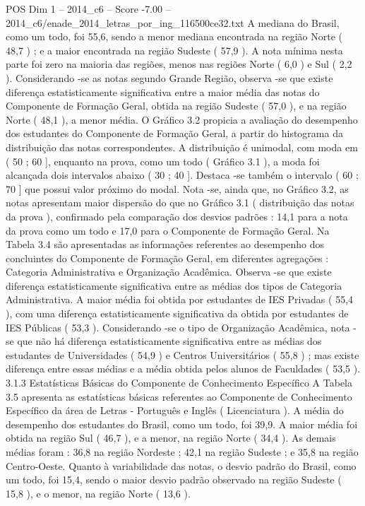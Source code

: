 \begin{textsample}{POS Dim 1 – 2014\_c6 – Score -7.00 – 2014\_c6/enade\_2014\_letras\_por\_ing\_116500ce32.txt}
A mediana do Brasil, como um todo, foi 55,6, sendo a menor mediana encontrada na região Norte ( 48,7 ) ; e a maior encontrada na região Sudeste ( 57,9 ).
A nota mínima nesta parte foi zero na maioria das regiões, menos nas regiões Norte ( 6,0 ) e Sul ( 2,2 ).
Considerando -se as notas segundo Grande Região, observa -se que existe diferença estatisticamente significativa entre a maior média das notas do Componente de Formação Geral, obtida na região Sudeste ( 57,0 ), e na região Norte ( 48,1 ), a menor média.
O Gráfico 3.2 propicia a avaliação do desempenho dos estudantes do Componente de Formação Geral, a partir do histograma da distribuição das notas correspondentes.
A distribuição é unimodal, com moda em ( 50 ; 60 ], enquanto na prova, como um todo ( Gráfico 3.1 ), a moda foi alcançada dois intervalos abaixo ( 30 ; 40 ].
Destaca -se também o intervalo ( 60 ; 70 ] que possui valor próximo do modal.
Nota -se, ainda que, no Gráfico 3.2, as notas apresentam maior dispersão do que no Gráfico 3.1 ( distribuição das notas da prova ), confirmado pela comparação dos desvios padrões : 14,1 para a nota da prova como um todo e 17,0 para o Componente de Formação Geral.
Na Tabela 3.4 são apresentadas as informações referentes ao desempenho dos concluintes do Componente de Formação Geral, em diferentes agregações : Categoria Administrativa e Organização Acadêmica.
Observa -se que existe diferença estatisticamente significativa entre as médias dos tipos de Categoria Administrativa.
A maior média foi obtida por estudantes de IES Privadas ( 55,4 ), com uma diferença estatisticamente significativa da obtida por estudantes de IES Públicas ( 53,3 ).
Considerando -se o tipo de Organização Acadêmica, nota -se que não há diferença estatisticamente significativa entre as médias dos estudantes de Universidades ( 54,9 ) e Centros Universitários ( 55,8 ) ; mas existe diferença entre essas médias e a média obtida pelos alunos de Faculdades ( 53,5 ). 3.1.3 Estatísticas Básicas do Componente de Conhecimento Específico A Tabela 3.5 apresenta as estatísticas básicas referentes ao Componente de Conhecimento Específico da área de Letras - Português e Inglês ( Licenciatura ).
A média do desempenho dos estudantes do Brasil, como um todo, foi 39,9.
A maior média foi obtida na região Sul ( 46,7 ), e a menor, na região Norte ( 34,4 ).
As demais médias foram : 36,8 na região Nordeste ; 42,1 na região Sudeste ; e 35,8 na região Centro-Oeste.
Quanto à variabilidade das notas, o desvio padrão do Brasil, como um todo, foi 15,4, sendo o maior desvio padrão observado na região Sudeste ( 15,8 ), e o menor, na região Norte ( 13,6 ).

\end{textsample}
